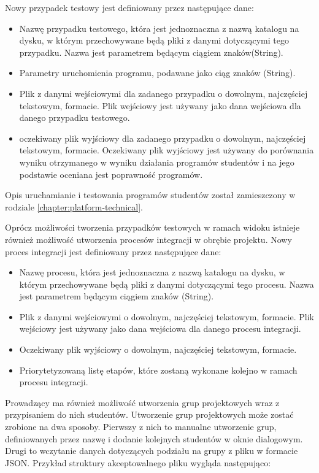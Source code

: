 Nowy przypadek testowy jest definiowany przez następujące dane:
\begin {itemize}
    \item Nazwę przypadku testowego, która jest jednoznaczna z nazwą katalogu na dysku, w którym przechowywane będą pliki z danymi dotyczącymi tego przypadku.
    Nazwa jest parametrem będącym ciągiem znaków(String).
    \item Parametry uruchomienia programu, podawane jako ciąg znaków (String).
    \item Plik z danymi wejściowymi dla zadanego przypadku o dowolnym, najczęściej tekstowym, formacie.
    Plik wejściowy jest używany jako dana wejściowa dla danego przypadku testowego.
    \item oczekiwany plik wyjściowy dla zadanego przypadku o dowolnym, najczęściej tekstowym, formacie.
    Oczekiwany plik wyjściowy jest używany do porównania wyniku otrzymanego w wyniku działania programów studentów i na jego podstawie oceniana jest poprawność programów.
\end {itemize}

Opis uruchamianie i testowania programów studentów został zamieszczony w rodziale \ref{chapter:platform-technical}.

Oprócz możliwości tworzenia przypadków testowych w ramach widoku istnieje również możliwość utworzenia procesów integracji w obrębie projektu.
Nowy proces integracji jest definiowany przez następujące dane:
\begin {itemize}
    \item Nazwę procesu, która jest jednoznaczna z nazwą katalogu na dysku, w którym przechowywane będą pliki z danymi dotyczącymi tego procesu.
    Nazwa jest parametrem będącym ciągiem znaków (String).
    \item Plik z danymi wejściowymi o dowolnym, najczęściej tekstowym, formacie.
    Plik wejściowy jest używany jako dana wejściowa dla danego procesu integracji.
    \item Oczekiwany plik wyjściowy o dowolnym, najczęściej tekstowym, formacie.
    \item Priorytetyzowaną listę etapów, które zostaną wykonane kolejno w ramach procesu integracji.
\end {itemize}

Prowadzący ma również możliwość utworzenia grup projektowych wraz z przypisaniem do nich studentów.
Utworzenie grup projektowych może zostać zrobione na dwa sposoby.
Pierwszy z nich to manualne utworzenie grup, definiowanych przez nazwę i dodanie kolejnych studentów w oknie dialogowym.
Drugi to wczytanie danych dotyczących podziału na grupy z pliku w formacie JSON.
Przykład struktury akceptowalnego pliku wygląda następująco:

